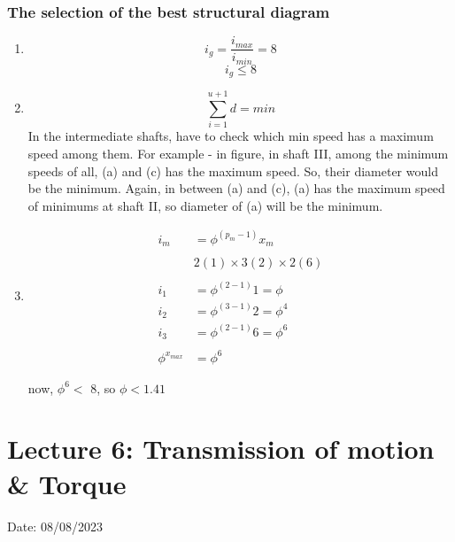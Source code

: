 \documentclass{article}
\begin{document}
\begin{multicols*}{2}
  \subsubsection*{The selection of the best structural diagram}
  \begin{enumerate}
    \item $$i_g = \frac{i_{max}}{i_{min}} = 8$$
    $$i_g \leq 8$$
    \item $$\sum_{i = 1}^{u+1} d = min $$
    In the intermediate shafts, have to check which min speed has a maximum speed among them. For example - in figure, in shaft III, among the minimum speeds of all, (a) and (c) has the maximum speed. So, their diameter would be the minimum. Again, in between (a) and (c), (a) has the maximum speed of minimums at shaft II, so diameter of (a) will be the minimum.
    \item 
    \begin{align*}
      i_m &= \phi^{(p_m - 1)}x_m \\ 
      &\\
      & 2(1)\times 3(2)\times 2(6) \\ 
      &\\
      i_1 &= \phi^{(2 - 1)}1 = \phi \\ 
      i_2 &= \phi^{(3 - 1)}2 = \phi^4\\ 
      i_3 &= \phi^{(2 - 1)}6 = \phi^6\\ 
      &\\
      \phi^{x_{max}} &= \phi^6
    \end{align*}

    now, $\phi^6 < $  8, so $\phi < 1.41$ 
  \end{enumerate}

\end{multicols*}

\section{Lecture 6: Transmission of motion \& Torque}
\hfill Date: 08/08/2023
\end{document}

